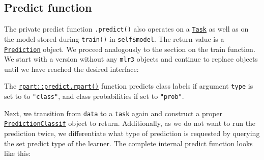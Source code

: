 \documentclass[]{scrbook}
\newenvironment{Shaded}{\begin{snugshade}}{\end{snugshade}}
\newcommand{\CommentTok}[1]{\textcolor[rgb]{0.56,0.35,0.01}{\textit{#1}}}
\newcommand{\DataTypeTok}[1]{\textcolor[rgb]{0.13,0.29,0.53}{#1}}
\newcommand{\KeywordTok}[1]{\textcolor[rgb]{0.13,0.29,0.53}{\textbf{#1}}}
\newcommand{\NormalTok}[1]{#1}
\newcommand{\OperatorTok}[1]{\textcolor[rgb]{0.81,0.36,0.00}{\textbf{#1}}}
\newcommand{\StringTok}[1]{\textcolor[rgb]{0.31,0.60,0.02}{#1}}
\renewenvironment{Shaded} {\begin{snugshade}\small} {\end{snugshade}}
\begin{document}
\hypertarget{learner-predict}{%
\subsection{Predict function}\label{learner-predict}}

The private predict function \texttt{.predict()} also operates on a \href{https://mlr3.mlr-org.com/reference/Task.html}{\texttt{Task}} as well as on the model stored during \texttt{train()} in \texttt{self\$model}.
The return value is a \href{https://mlr3.mlr-org.com/reference/Prediction.html}{\texttt{Prediction}} object.
We proceed analogously to the section on the train function.
We start with a version without any \texttt{mlr3} objects and continue to replace objects until we have reached the desired interface:

\begin{Shaded}
\end{Shaded}

The \href{https://www.rdocumentation.org/packages/rpart/topics/predict.rpart}{\texttt{rpart::predict.rpart()}} function predicts class labels if argument \texttt{type} is set to to \texttt{"class"}, and class probabilities if set to \texttt{"prob"}.

Next, we transition from \texttt{data} to a \texttt{task} again and construct a proper \href{https://mlr3.mlr-org.com/reference/PredictionClassif.html}{\texttt{PredictionClassif}} object to return.
Additionally, as we do not want to run the prediction twice, we differentiate what type of prediction is requested by querying the set predict type of the learner.
The complete internal predict function looks like this:
\end{document}
